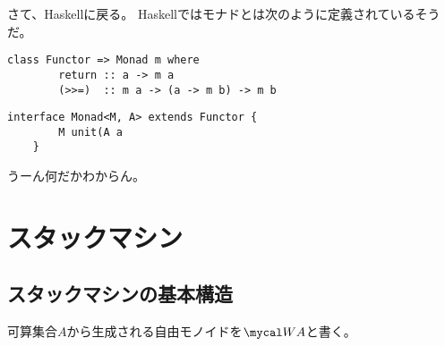 {	さて、Haskellに戻る。
	Haskellではモナドとは次のように定義されているそうだ。
	\begin{lstlisting}[caption=Monad in Haskell, label=code:Monad in Haskell]
	class Functor => Monad m where
		return :: a -> m a
		(>>=)  :: m a -> (a -> m b) -> m b
	\end{lstlisting}
	\begin{lstlisting}[caption=Monad in Java, label=code:Monad in Java]
	interface Monad<M, A> extends Functor {
		M unit(A a
	}
	\end{lstlisting}
	うーん何だかわからん。
\section{スタックマシン}\label{s1:スタックマシン} %
\begingroup %
	\newcommand{\Drop}{\myop{Drop}}
	\newcommand{\Copy}{\myop{Copy}}
	\newcommand{\Rot}{\myop{Rot}}
	\newcommand{\Prot}{\myop{pRot}}
	\newcommand{\Tuck}{\myop{Tuck}}

\subsection{スタックマシンの基本構造}\label{s2:スタックマシンの基本構造} %
	可算集合$A$から生成される自由モノイドを$\W A$と書く。

}
